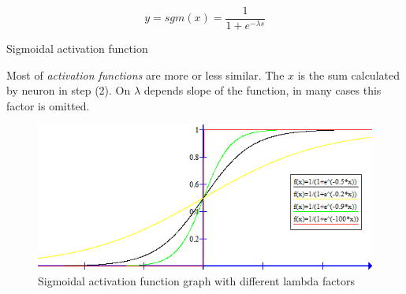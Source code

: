 \begin{mycapequ}[!ht]
    $$y = sgm(x) = \frac{1}{1+e^{-\lambda s}}$$
    \caption{Sigmoidal activation function}
    \label{formula:SigmoidalActivationFunction}
\end{mycapequ}

Most of \textit{activation functions} are more or less similar. The $x$ is the sum calculated by neuron in step (2). On $\lambda$ depends slope of the function, in many cases this factor is omitted. 

\newpage

\begin{figure}[!h]
    \centering
    \includegraphics[scale=1]{Media/sgm_graph.png}
    \caption[Sigmoidal activation function graph]{Sigmoidal activation function graph with different lambda factors}
    \label{fig:SigmoidalFunctionGraph}
\end{figure}


